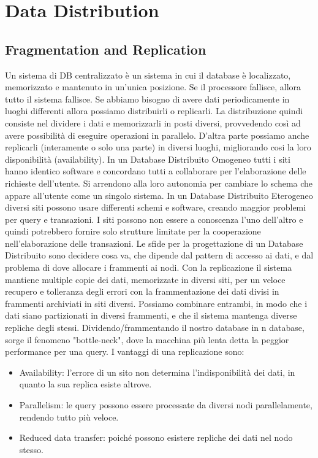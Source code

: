 \documentclass[a4page, 11pt]{article}
\begin{document}
\section{Data Distribution}
\subsection{Fragmentation and Replication}
Un sistema di DB centralizzato è un sistema in cui il database è localizzato, memorizzato e mantenuto in un'unica posizione. Se il processore fallisce, allora tutto il sistema fallisce.
Se abbiamo bisogno di avere dati periodicamente in luoghi differenti allora possiamo distribuirli o replicarli. La distribuzione quindi consiste nel dividere i dati e memorizzarli in posti diversi, provvedendo così ad avere possibilità di eseguire operazioni in parallelo. D'altra parte possiamo anche replicarli (interamente o solo una parte) in diversi luoghi, migliorando cosi la loro disponibilità (availability).
\newline
In un Database Distribuito Omogeneo tutti i siti hanno identico software e concordano tutti a collaborare per l'elaborazione delle richieste dell'utente. Si arrendono alla loro autonomia per cambiare lo schema che appare all'utente come un singolo sistema.
\newline
In un Database Distribuito Eterogeneo diversi siti possono usare differenti schemi e software, creando maggior problemi per query e transazioni. I siti possono non essere a conoscenza l'uno dell'altro e quindi potrebbero fornire solo strutture limitate per la cooperazione nell'elaborazione delle transazioni.
\newline
Le sfide per la progettazione di un Database Distribuito sono decidere cosa va, che dipende dal pattern di accesso ai dati, e dal problema di dove allocare i frammenti ai nodi.
Con la replicazione il sistema mantiene multiple copie dei dati, memorizzate in diversi siti, per un veloce recupero e tolleranza degli errori con la frammentazione dei dati divisi in frammenti archiviati in siti diversi. Possiamo combinare entrambi, in modo che i dati siano partizionati in diversi frammenti, e che il sistema mantenga diverse repliche degli stessi.
\newline
Dividendo/frammentando il nostro database in n database, sorge il fenomeno "bottle-neck", dove la macchina più lenta detta la peggior performance per una query.
\newline
I vantaggi di una replicazione sono:
\begin{itemize}[noitemsep]
	\item
	Availability: l'errore di un sito non determina l'indisponibilità dei dati, in quanto la sua replica esiste altrove.
	\item
	Parallelism: le query possono essere processate da diversi nodi parallelamente, rendendo tutto più veloce.
	\item
	Reduced data transfer: poiché possono esistere repliche dei dati nel nodo stesso.
\end{itemize}
\end{document}
